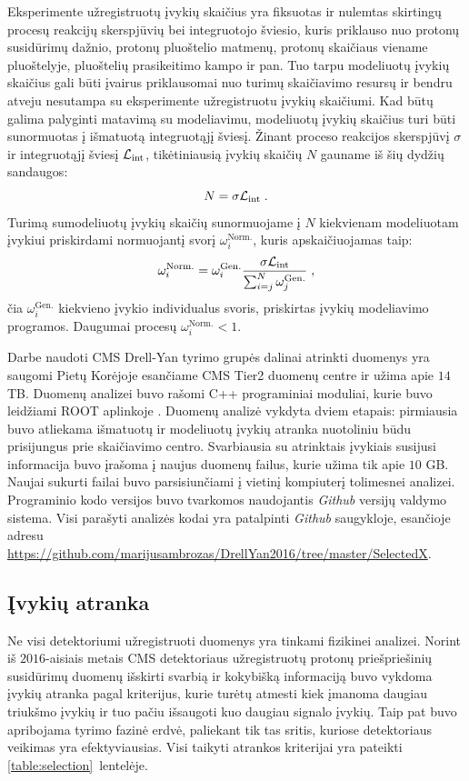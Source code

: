 \documentclass[a4paper, 12pt, oneside]{article}
\newcommand{\Lumi}{{\cal L}_\mathrm{int}}
\newlength\q
\begin{document}
Eksperimente užregistruotų įvykių skaičius yra fiksuotas ir nulemtas skirtingų procesų reakcijų skerspjūvių bei
integruotojo šviesio, kuris priklauso nuo protonų susidūrimų dažnio, protonų pluoštelio matmenų, protonų skaičiaus
viename pluoštelyje, pluoštelių prasikeitimo kampo ir pan.
Tuo tarpu modeliuotų įvykių skaičius gali būti įvairus priklausomai nuo turimų skaičiavimo resursų ir bendru atveju
nesutampa su eksperimente užregistruotu įvykių skaičiumi.
Kad būtų galima palyginti matavimą su modeliavimu, modeliuotų įvykių skaičius turi būti sunormuotas
į išmatuotą integruotąjį šviesį.
Žinant proceso reakcijos skerspjūvį $\sigma$ ir integruotąjį šviesį $\Lumi$, tikėtiniausią įvykių skaičių $N$
gauname iš šių dydžių sandaugos:
\begin{equation}
	N = \sigma\Lumi \; .
\end{equation}
Turimą sumodeliuotų įvykių skaičių sunormuojame į $N$ kiekvienam modeliuotam įvykiui priskirdami normuojantį svorį
$\omega_{i}^{\mathrm{Norm.}}$, kuris apskaičiuojamas taip:
\begin{equation}
	\omega_{i}^{\mathrm{Norm.}} = \omega_{i}^{\mathrm{Gen.}} \frac{ \sigma\Lumi }{ \sum_{i=j}^{N}\omega_{j}^{\mathrm{Gen.}} } \; ,
	\label{eq:NLOweight}
\end{equation}
čia $\omega_{i}^{\mathrm{Gen.}}$ kiekvieno įvykio individualus svoris, priskirtas įvykių modeliavimo programos.
Daugumai procesų $\omega_{i}^{\mathrm{Norm.}}<1$.

Darbe naudoti CMS Drell-Yan tyrimo grupės dalinai atrinkti duomenys yra saugomi Pietų Korėjoje esančiame CMS Tier2
duomenų centre ir užima apie $14$ TB.
Duomenų analizei buvo rašomi C++ programiniai moduliai, kurie buvo leidžiami ROOT aplinkoje \cite{ROOTarticle}.
Duomenų analizė vykdyta dviem etapais: pirmiausia buvo atliekama išmatuotų ir modeliuotų įvykių atranka nuotoliniu
būdu prisijungus prie skaičiavimo centro.
Svarbiausia su atrinktais įvykiais susijusi informacija buvo įrašoma į naujus duomenų failus, kurie užima tik
apie $10$ GB.
Naujai sukurti failai buvo parsisiunčiami į vietinį kompiuterį tolimesnei analizei.
Programinio kodo versijos buvo tvarkomos naudojantis \textit{Github} versijų valdymo sistema.
Visi parašyti analizės kodai yra patalpinti \textit{Github} saugykloje, esančioje adresu
\url{https://github.com/marijusambrozas/DrellYan2016/tree/master/SelectedX}.


\subsection{Įvykių atranka}\label{sec:selection}
Ne visi detektoriumi užregistruoti duomenys yra tinkami fizikinei analizei.
Norint iš $2016$-aisiais metais CMS detektoriaus užregistruotų protonų priešpriešinių susidūrimų duomenų išskirti svarbią
ir kokybišką informaciją buvo vykdoma įvykių atranka pagal kriterijus, kurie turėtų atmesti kiek įmanoma daugiau triukšmo
įvykių ir tuo pačiu išsaugoti kuo daugiau signalo įvykių.
Taip pat buvo apribojama tyrimo fazinė erdvė, paliekant tik tas sritis, kuriose detektoriaus veikimas yra efektyviausias.
Visi taikyti atrankos kriterijai yra pateikti \ref{table:selection}~lentelėje.
\end{document}
